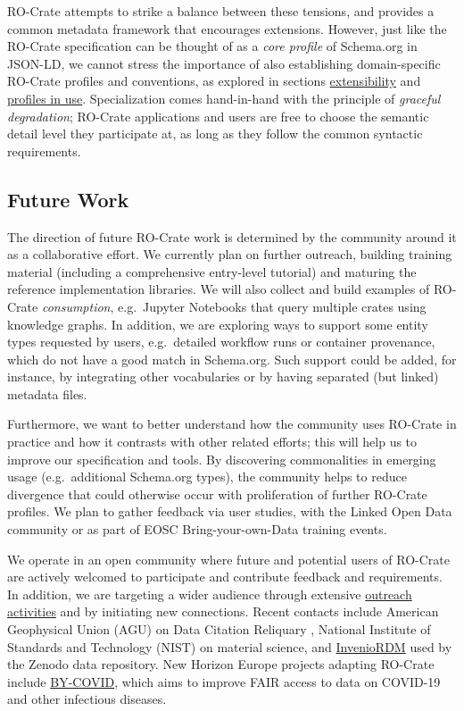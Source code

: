 {RO-Crate attempts to strike a balance between these tensions, and
provides a common metadata framework that encourages extensions.
However, just like the RO-Crate specification can be thought of as a
\emph{core profile} of Schema.org in JSON-LD, we cannot stress the
importance of also establishing domain-specific RO-Crate profiles and
conventions, as explored in sections
\protect\hyperlink{profiles}{extensibility} and
\protect\hyperlink{inuse}{profiles in use}. Specialization comes
hand-in-hand with the principle of \emph{graceful degradation}; RO-Crate
applications and users are free to choose the semantic detail level they
participate at, as long as they follow the common syntactic
requirements.

\hypertarget{futurework}{%
\subsection{Future Work}\label{futurework}}

The direction of future RO-Crate work is determined by the community
around it as a collaborative effort. We currently plan on further
outreach, building training material (including a comprehensive
entry-level tutorial) and maturing the reference implementation
libraries. We will also collect and build examples of RO-Crate
\emph{consumption}, e.g.~Jupyter Notebooks that query multiple crates
using knowledge graphs. In addition, we are exploring ways to support
some entity types requested by users, e.g.~detailed workflow runs or
container provenance, which do not have a good match in Schema.org. Such
support could be added, for instance, by integrating other vocabularies
or by having separated (but linked) metadata files.

Furthermore, we want to better understand how the community uses
RO-Crate in practice and how it contrasts with other related efforts;
this will help us to improve our specification and tools. By discovering
commonalities in emerging usage (e.g.~additional Schema.org types), the
community helps to reduce divergence that could otherwise occur with
proliferation of further RO-Crate profiles. We plan to gather feedback
via user studies, with the Linked Open Data community or as part of EOSC
Bring-your-own-Data training events.

We operate in an open community where future and potential users of
RO-Crate are actively welcomed to participate and contribute feedback
and requirements. In addition, we are targeting a wider audience through
extensive
\href{https://www.researchobject.org/ro-crate/outreach.html}{outreach
activities} and by initiating new connections. Recent contacts include
American Geophysical Union (AGU) on Data Citation Reliquary
\cite{Agarwal 2021}, National
Institute of Standards and Technology (NIST) on material science, and
\href{https://inveniosoftware.org/products/rdm/}{InvenioRDM} used by the
Zenodo data repository. New Horizon Europe projects adapting RO-Crate
include \href{https://by-covid.org/}{BY-COVID}, which aims to improve
FAIR access to data on COVID-19 and other infectious diseases.

}
